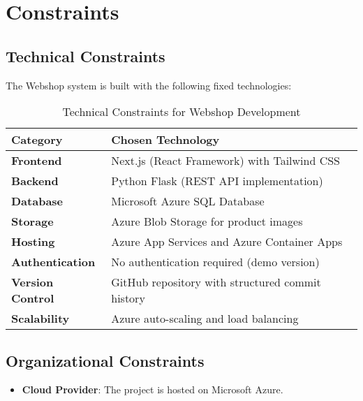 \hypertarget{constraints}{%
\section{Constraints}\label{section-constraints}}

\subsection{Technical Constraints}
The Webshop system is built with the following fixed technologies:

\begin{table}[h]
\centering
\begin{tabular}{|l|l|}
\hline
\textbf{Category} & \textbf{Chosen Technology} \\ \hline
\textbf{Frontend} & Next.js (React Framework) with Tailwind CSS \\ \hline
\textbf{Backend} & Python Flask (REST API implementation) \\ \hline
\textbf{Database} & Microsoft Azure SQL Database \\ \hline
\textbf{Storage} & Azure Blob Storage for product images \\ \hline
\textbf{Hosting} & Azure App Services and Azure Container Apps \\ \hline
\textbf{Authentication} & No authentication required (demo version) \\ \hline
\textbf{Version Control} & GitHub repository with structured commit history \\ \hline
\textbf{Scalability} & Azure auto-scaling and load balancing \\ \hline
\end{tabular}
\caption{Technical Constraints for Webshop Development}
\label{tab:constraints}
\end{table}

\subsection{Organizational Constraints}
\begin{itemize}
    \item \textbf{Cloud Provider}: The project is hosted on Microsoft Azure.
\end{itemize}

